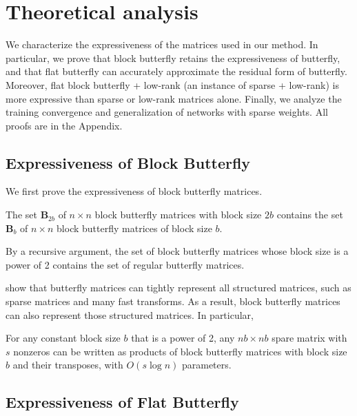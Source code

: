 \section{Theoretical analysis}
\label{sec:analysis}

We characterize the expressiveness of the matrices used in our method. In particular, we prove that block butterfly retains the expressiveness of butterfly, and that flat butterfly can accurately approximate the residual form of butterfly. Moreover, flat block butterfly + low-rank (an instance of sparse + low-rank) is more expressive than sparse or low-rank matrices alone. Finally, we analyze the training convergence and generalization of networks with sparse weights. All proofs are in the Appendix.

\subsection{Expressiveness of Block Butterfly} We first prove the expressiveness of block butterfly matrices.

\begin{theorem}
  \label{thm:block_butterfly}
  The set $\mathbf{B}_{2b}$ of $n \times n$ block butterfly matrices with block size $2b$ contains the set $\mathbf{B}_b$ of $n \times n$ block butterfly matrices of block size $b$.
\end{theorem}

By a recursive argument, the set of block butterfly matrices whose block size is a power of 2 contains the set of regular butterfly matrices.

\citet{dao2020kaleidoscope} show that butterfly matrices can tightly represent all structured matrices, such as sparse matrices and many fast transforms. As a result, block butterfly matrices can also represent those structured matrices. In particular,

\begin{corollary}
  \label{cor:block_butterfly_contains_sparse}
  For any constant block size $b$ that is a power of 2, any $nb \times nb$ spare matrix with $s$ nonzeros can be written as products of block butterfly matrices with block size $b$ and their transposes, with $O(s \log n)$ parameters.
\end{corollary}

\subsection{Expressiveness of Flat Butterfly}


